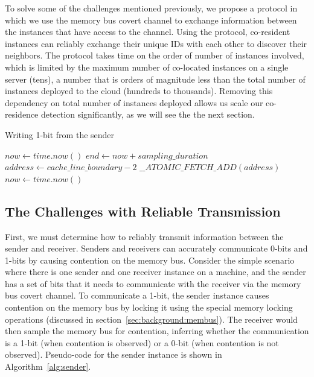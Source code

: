 To solve some of the challenges mentioned previously, we propose a protocol in
which we use the memory bus covert channel to exchange information between the
instances that have access to the channel. Using the protocol, co-resident
instances can reliably exchange their unique IDs with each other to discover
their neighbors. The protocol takes time on the order of number of instances
involved, which is limited by the maximum number of co-located instances on a
single server (tens), a number that is orders of magnitude less than the total
number of instances deployed to the cloud (hundreds to thousands). Removing this
dependency on total number of instances deployed allows us scale our co-residence
detection significantly, as we will see the the next section.


 

\begin{algorithm}[!t]
\caption{Writing 1-bit from the sender}
\label{alg:sender}
\begin{algorithmic}
\STATE $now \leftarrow  time.now()$
\STATE $end \leftarrow now + sampling\_duration$
\STATE $address \leftarrow cache\_line\_boundary-2$
    \STATE $\_\_ATOMIC\_FETCH\_ADD(address)$
    \STATE $now \leftarrow  time.now()$
\ENDWHILE
\end{algorithmic}
\end{algorithm}

\subsection{The Challenges with Reliable Transmission}
First, we must determine how to reliably transmit information between the sender
and receiver. Senders and receivers can accurately communicate 0-bits and 1-bits
by causing contention on the memory bus. Consider the simple scenario where
there is one sender and one receiver instance on a machine, and the sender has a
set of bits that it needs to communicate with the receiver via the memory bus
covert channel.  To communicate a 1-bit, the sender instance causes contention
on the memory bus by locking it using the special memory locking operations
(discussed in section~\ref{sec:background:membus}). The receiver would then
sample the memory bus for contention, inferring whether the communication is a
1-bit (when contention is observed) or a 0-bit (when contention is not
observed). Pseudo-code for the sender instance is shown in
Algorithm~\ref{alg:sender}.


